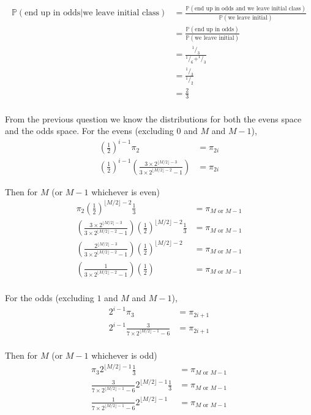 \documentclass{article}
\newcommand{\prob}{\mathbb{P}}
\begin{document}
\begin{align*}
    \prob(\text{end up in odds} | \text{we leave initial class})
    &= \frac{\prob(\text{end up in odds and we leave initial class})}{\prob(\text{we leave initial})} \\
    &= \frac{\prob(\text{end up in odds})}{\prob(\text{we leave initial})} \\
    &= \frac{^1/_3}{^1/_6 + ^1/_3} \\
    &= \frac{^1/_3}{^1/_2} \\
    &= \frac{2}{3} \\
\end{align*}

From the previous question we know the distributions for both the evens
space and the odds space. For the evens (excluding $0$ and $M$ and $M-1$),
\begin{align*}
    {\left(\frac{1}{2}\right)}^{i-1} \pi_{2} &= \pi_{2i} \\
    {\left(\frac{1}{2}\right)}^{i-1}
    \left(\frac{3 \times 2^{\lfloor M/2 \rfloor - 3}}
    {3 \times 2^{\lfloor M/2 \rfloor - 2}-1}\right)
    &= \pi_{2i}
\end{align*}

Then for $M$ (or $M-1$ whichever is even)
\begin{align*}
    \pi_2 {\left(\frac{1}{2}\right)}^{\lfloor M/2 \rfloor-2} \frac{1}{3} &= \pi_{M\text{ or }M-1} \\
    \left(\frac{3 \times 2^{\lfloor M/2 \rfloor - 3}}
    {3 \times 2^{\lfloor M/2 \rfloor - 2}-1}\right)
    {\left(\frac{1}{2}\right)}^{\lfloor M/2 \rfloor-2} \frac{1}{3} &= \pi_{M\text{ or }M-1} \\
    \left(\frac{2^{\lfloor M/2 \rfloor - 3}}
    {3 \times 2^{\lfloor M/2 \rfloor - 2}-1}\right)
    {\left(\frac{1}{2}\right)}^{\lfloor M/2 \rfloor-2} &= \pi_{M\text{ or }M-1} \\
    \left(\frac{1}{3 \times 2^{\lfloor M/2 \rfloor - 2}-1}\right)
    {\left(\frac{1}{2}\right)} &= \pi_{M\text{ or }M-1} \\
\end{align*}

For the odds (excluding $1$ and $M$ and $M-1$),
\begin{align*}
    2^{i-1} \pi_{3} &= \pi_{2i+1} \\
    2^{i-1} \frac{3}{7\times2^{\lfloor M/2 \rfloor - 1} - 6} &= \pi_{2i+1} \\
\end{align*}

Then for $M$ (or $M-1$ whichever is odd)
\begin{align*}
    \pi_3 2^{\lfloor M/2 \rfloor-1} \frac{1}{3} &= \pi_{M\text{ or }M-1} \\
    \frac{3}{7\times2^{\lfloor M/2 \rfloor - 1} - 6} 2^{\lfloor M/2 \rfloor-1} \frac{1}{3} &= \pi_{M\text{ or }M-1} \\
    \frac{1}{7\times2^{\lfloor M/2 \rfloor - 1} - 6} 2^{\lfloor M/2 \rfloor-1} &= \pi_{M\text{ or }M-1} \\
\end{align*}
\end{document}
